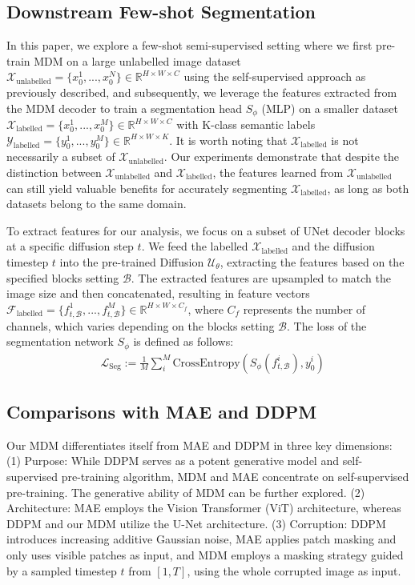 \documentclass{article} \usepackage{iclr2024_conference,times}
\begin{document}
\subsection{Downstream Few-shot Segmentation}
In this paper, we explore a few-shot semi-supervised setting where we first pre-train MDM on a large unlabelled image dataset \(\mathcal{X}_{\textrm{unlabelled}}=\{x_{0}^{1}, ..., x_{0}^{N} \} \in \mathbb{R}^{H \times W \times C}\) using the self-supervised approach as previously described, and subsequently, we  leverage the features extracted from the MDM decoder to train a segmentation head $S_\phi$ (MLP) on a smaller dataset \(\mathcal{X}_{\textrm{labelled}}=\{x_{0}^{1}, ..., x_{0}^{M}\}\in \mathbb{R}^{H \times W \times C}\) with K-class semantic labels \(\mathcal{Y}_{\textrm{labelled}}=\{y_{0}^{1}, ..., y_{0}^{M}\}\in \mathbb{R}^{H \times W \times K}\). 
It is worth noting that \(\mathcal{X}_{\textrm{labelled}}\) is not necessarily a subset of \(\mathcal{X}_{\textrm{unlabelled}}\). Our experiments demonstrate that despite the distinction between \(\mathcal{X}_{\textrm{unlabelled}}\) and \(\mathcal{X}_{\textrm{labelled}}\), the features learned from \(\mathcal{X}_{\textrm{unlabelled}}\) can still yield valuable benefits for accurately segmenting \(\mathcal{X}_{\textrm{labelled}}\), as long as both datasets belong to the same domain. 

To extract features for our analysis, we focus on a subset of UNet decoder blocks at a specific diffusion step \(t\). We feed the labelled $\mathcal{X}_{\textrm{labelled}}$ and the diffusion timestep $t$ into the pre-trained Diffusion \(\mathcal{U}_\theta\), extracting the features based on the specified blocks setting $\mathcal{B}$.
The extracted features are upsampled to match the image size and then concatenated, resulting in feature vectors \(\mathcal{F}_{\textrm{labelled}} = \{f_{t, \mathcal{B}}^{1}, ..., f_{t, \mathcal{B}}^{M}\} \in \mathbb{R}^{H \times W \times C_f}\), where \(C_f\) represents the number of channels, which varies depending on the blocks setting \(\mathcal{B}\). The loss of the segmentation network $S_\phi$ is defined as follows:
\begin{align}
    &\mathcal{L}_{\textrm{Seg}} := \frac{1}{M} \sum_{i}^{M} \textrm{CrossEntropy}(S_\phi(f_{t, \mathcal{B}}^i), y_0^i) \label{Seg_Loss} \nonumber
\end{align}

\subsection{Comparisons with MAE and DDPM}
Our MDM differentiates itself from MAE and DDPM in three key dimensions: (1) Purpose: While DDPM serves as a potent generative model and self-supervised pre-training algorithm, MDM and MAE concentrate on self-supervised pre-training. The generative ability of MDM can be further explored. (2) Architecture: MAE employs the Vision Transformer (ViT) architecture, whereas DDPM and our MDM utilize the U-Net architecture. (3) Corruption: DDPM introduces increasing additive Gaussian noise, MAE applies patch masking and only uses visible patches as input, and MDM employs a masking strategy guided by a sampled timestep $t$ from $[1, T]$, using the whole corrupted image as input.
\end{document}
